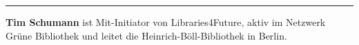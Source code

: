 \begin{center}\rule{0.5\linewidth}{0.5pt}\end{center}

\textbf{Tim Schumann} ist Mit-Initiator von Libraries4Future, aktiv im
Netzwerk Grüne Bibliothek und leitet die Heinrich-Böll-Bibliothek in
Berlin.
